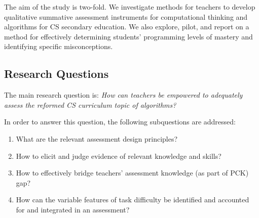 The aim of the study is two-fold. We investigate methods for teachers to develop qualitative summative assessment instruments for computational thinking and algorithms for CS secondary education. We also explore, pilot, and report on a method for effectively determining students' programming levels of mastery and identifying specific misconceptions.







\subsection*{Research Questions}

%

The main research question is: \emph{How can teachers be empowered to adequately assess the reformed CS curriculum topic of algorithms?}


In order to answer this question, the following subquestions are addressed:
\begin{enumerate}
\item What are the relevant assessment design principles?
\item How to elicit and judge evidence of relevant knowledge and skills?
\item How to effectively bridge teachers' assessment knowledge (as part of PCK) gap?
\item How can the variable features of task difficulty be identified and accounted for and integrated in an assessment?


\end{enumerate} 

